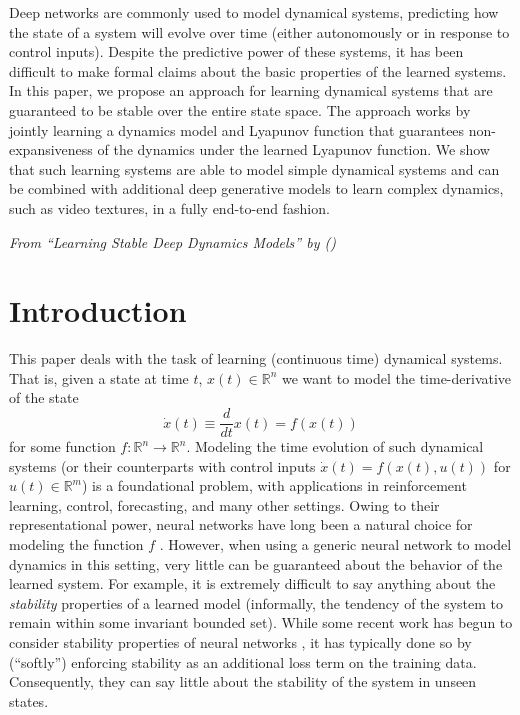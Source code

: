 Deep networks are commonly used to model dynamical systems, predicting how the state of a system will evolve over time (either autonomously or in response to control inputs). Despite the predictive power of these systems, it has been difficult to make formal claims about the basic properties of the learned systems. In this paper, we propose an approach for learning dynamical systems that are guaranteed to be stable over the entire state space. The approach works by jointly learning a dynamics model and Lyapunov function that guarantees non-expansiveness of the dynamics under the learned Lyapunov function. We show that such learning systems are able to model simple dynamical systems and can be combined with additional deep generative models to learn complex dynamics, such as video textures, in a fully end-to-end fashion.

\emph{From ``Learning Stable Deep Dynamics Models'' by \citeauthor{manek2019stable} (\citeyear{manek2019stable})}

\clearpage

\section{Introduction}

This paper deals with the task of learning (continuous time) dynamical systems.  That is, given a state at time $t$, $x(t) \in \mathbb{R}^n$ we want to model the time-derivative of the state
\begin{equation}
    \dot{x}(t) \equiv \frac{d}{dt}x(t) = f(x(t))
\end{equation}
for some function $f : \mathbb{R}^n \rightarrow \mathbb{R}^n$. Modeling the time evolution of such dynamical systems (or their counterparts with control inputs $\dot{x}(t) = f(x(t),u(t))$ for $u(t) \in \mathbb{R}^m$) is a foundational problem, with applications in reinforcement learning, control, forecasting, and many other settings.  Owing to their representational power, neural networks have long been a natural choice for modeling the function $f$ \citep{gu2016continuous,nagabandi2018neural,mishra2017prediction,gal2016improving}.  However, when using a generic neural network to model dynamics in this setting, very little can be guaranteed about the behavior of the learned system.  For example, it is extremely difficult to say anything about the \emph{stability} properties of a learned model (informally, the tendency of the system to remain within some invariant bounded set).  While some recent work has begun to consider stability properties of neural networks \citep{chow2018lyapunov,richards2018lyapunov,taylor2019episodic}, it has typically done so by (``softly'') enforcing stability as an additional loss term on the training data. Consequently, they can say little about the stability of the system in unseen states.


